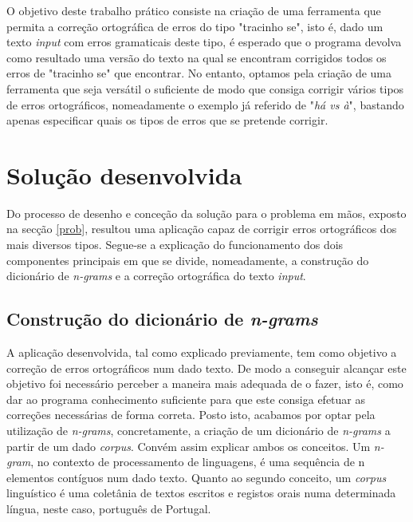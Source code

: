 \documentclass{article}
\begin{document}
O objetivo deste trabalho prático consiste na criação de uma ferramenta que permita a correção ortográfica de erros do tipo "tracinho se", isto é, dado um texto \textit{input} com erros gramaticais deste tipo, é esperado que o programa devolva como resultado uma versão do texto na qual se encontram corrigidos todos os erros de "tracinho se" que encontrar. No entanto, optamos pela criação de uma ferramenta que seja versátil o suficiente de modo que consiga corrigir vários tipos de erros ortográficos, nomeadamente o exemplo já referido de "\textit{há vs à}", bastando apenas especificar quais os tipos de erros que se pretende corrigir.

\section{Solução desenvolvida}
Do processo de desenho e conceção da solução para o problema em mãos, exposto na secção \ref{prob}, resultou uma aplicação capaz de corrigir erros ortográficos dos mais diversos tipos. Segue-se a explicação do funcionamento dos dois componentes principais em que se divide, nomeadamente, a construção do dicionário de \textit{n-grams} e a correção ortográfica do texto \textit{input}.

\subsection{Construção do dicionário de \textit{n-grams}}
A aplicação desenvolvida, tal como explicado previamente, tem como objetivo a correção de erros ortográficos num dado texto. De modo a conseguir alcançar este objetivo foi necessário perceber a maneira mais adequada de o fazer, isto é, como dar ao programa conhecimento suficiente para que este consiga efetuar as correções necessárias de forma correta. Posto isto, acabamos por optar pela utilização de \textit{n-grams}, concretamente, a criação de um dicionário de \textit{n-grams} a partir de um dado \textit{corpus}. Convém assim explicar ambos os conceitos. Um \textit{n-gram}, no contexto de processamento de linguagens, é uma sequência de n elementos contíguos num dado texto\cite{ngram}. Quanto ao segundo conceito, um \textit{corpus} linguístico é uma coletânia de textos escritos e registos orais numa determinada língua\cite{corpus}, neste caso, português de Portugal. 
\end{document}
